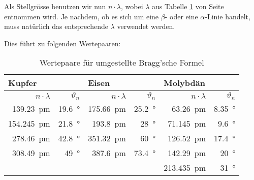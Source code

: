Als  Stellgr\"osse benutzen  wir nun  $n \cdot  \lambda$, wobei  $\lambda$ aus
Tabelle \ref{tab:anodeSpetralLines}  von Seite \pageref{tab:anodeSpetralLines}
entnommen  wird. Je   nachdem,  ob   es  sich  um   eine  $\beta$-  oder  eine
$\alpha$-Linie handelt, muss nat\"urlich das entsprechende $\lambda$ verwendet
werden.

Dies f\"uhrt zu folgenden Wertepaaren:


\begin{table}[h!]
    \centering
    \small
    \caption{Wertepaare f\"ur umgestellte Bragg'sche Formel}
    \label{tab:anodeSpetralLines}
    \begin{tabular}{rr|rr|rr}
        \toprule

        \multicolumn{2}{l}{Kupfer}     &
        \multicolumn{2}{l}{Eisen}      &
        \multicolumn{2}{l}{Molybd\"an} \\

        \midrule

        $n \cdot \lambda$ &
        $\vartheta_n$     &
        $n \cdot \lambda$ &
        $\vartheta_n$     &
        $n \cdot \lambda$ &
        $\vartheta_n$     \\

        \midrule

        \SI{139.23}{\pico\meter}  & \SI{19.6}{\degree} &
        \SI{175.66}{\pico\meter}  & \SI{25.2}{\degree} &
        \SI{63.26}{\pico\meter}   & \SI{8.35}{\degree} \\

        \SI{154.245}{\pico\meter} & \SI{21.8}{\degree} &
        \SI{193.8}{\pico\meter}   & \SI{28}{\degree} &
        \SI{71.145}{\pico\meter}  & \SI{9.6}{\degree} \\

        \SI{278.46}{\pico\meter}  & \SI{42.8}{\degree} &
        \SI{351.32}{\pico\meter}  & \SI{60}{\degree} &
        \SI{126.52}{\pico\meter}  & \SI{17.4}{\degree} \\

        \SI{308.49}{\pico\meter}  & \SI{49}{\degree} &
        \SI{387.6 }{\pico\meter}  & \SI{73.4}{\degree} &
        \SI{142.29}{\pico\meter}  & \SI{20}{\degree} \\

        & &
        & &
        \SI{213.435}{\pico\meter} & \SI{31}{\degree} \\


        \bottomrule
    \end{tabular}
\end{table}

